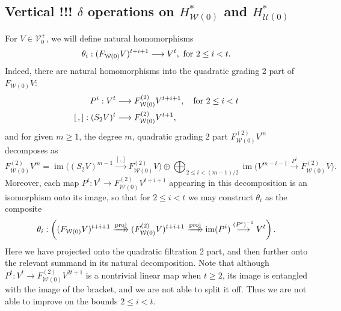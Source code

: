 \documentclass[11pt]{amsart}
\theoremstyle{plain}
\theoremstyle{definition}
\DeclareMathOperator{\im}{im}
\renewcommand{\to}{\longrightarrow}
\newcommand{\calW}{\mathcal{W}}
\newcommand{\calU}{\mathcal{U}}
\newcommand{\calV}{\mathcal{V}}
\theoremstyle{plain}
\newcommand{\vect}[2]{\calV^{#1}_{#2}}
\begin{document}
\begin{Cohomology operations for all unstable Lie algebras}
\subsection{Vertical \textbf{!!!} $\delta$ operations on $H^*_{\calW(0)}$ and $H^*_{\calU(0)}$}
For $V\in \vect{+}{0}$, we will define natural homomorphisms
\[\theta_i:(F_{\calW(0)}V)^{t+i+1}\to V^{t}, \textup{ for $2\leq i<t$}.\]
Indeed, there are natural homomorphisms into the quadratic grading 2 part of $F_{\calW(0)}V$:
\begin{align*}
P^i:V^{t}&\to F_{\calW(0)}^{(2)}V^{t+i+1}, \textup{\quad  for $2\leq i<t$}\\
[\,,]:(S_2V)^{t}&\to F_{\calW(0)}^{(2)}V^{t+1},
\end{align*}
and for given $m\geq1$, the degree $m$, quadratic grading 2 part $F_{\calW(0)}^{(2)}V^m$ decomposes as
%
\[F_{\calW(0)}^{(2)}V^{m}=%
\im \bigl((S_2V)^{m-1}\overset{[,]}{\to} F_{\calW(0)}^{(2)}V\bigr)%
\oplus\bigoplus_{\!\!\!\!\!\!2\leq i< (m-1)/2\!\!\!\!\!\!}\im \bigl(V^{m-i-1}\overset{P^i}{\to}F_{\calW(0)}^{(2)}V\bigr).\]
Moreover, each map $P^i:V^t\to F_{\calW(0)}^{(2)}V^{t+i+1}$ appearing in this decomposition is an isomorphism onto its image, so that for $2\leq i <t$ we may construct $\theta_i$ as the composite
\[\theta_i:\left((F_{\calW(0)}V)^{t+i+1}\overset{\textup{proj}}{\makebox[.06ex][l]{$\to$}\to} (F_{\calW(0)}^{(2)}V)^{t+i+1}\overset{\textup{proj}}{\makebox[.06ex][l]{$\to$}\to} \im (P^i)\overset{(P^i)^{-1}}{\to}V^{t}\right).\]
Here we have projected onto the quadratic filtration 2 part, and then further onto the relevant summand in its natural decomposition. Note that although $P^t:V^t\to F_{\calW(0)}^{(2)}V^{2t+1}$ is a nontrivial linear map when $t\geq2$, its image is entangled with the image of the bracket, and we are not able to split it off. Thus we are not able to improve on the bounds $2\leq i< t$.


\end{Cohomology operations for all unstable Lie algebras}
\end{document}
